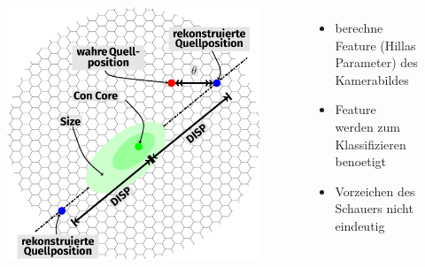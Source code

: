 \documentclass[aspectratio=1610, professionalfonts, 9pt]{beamer}
\begin{document}
\begin{frame}
  \begin{columns}[onlytextwidth]
	\begin{figure}
	  \centering
	  \includegraphics[height=0.8\textheight]{./tikz/Camera/Camera.pdf}
	\end{figure}
	\begin{itemize}
	  \item berechne Feature (Hillas Parameter) des Kamerabildes
	  \item Feature werden zum Klassifizieren benoetigt
	  \item Vorzeichen des Schauers nicht eindeutig
	\end{itemize}
  \end{columns}
\end{frame}
\end{document}
